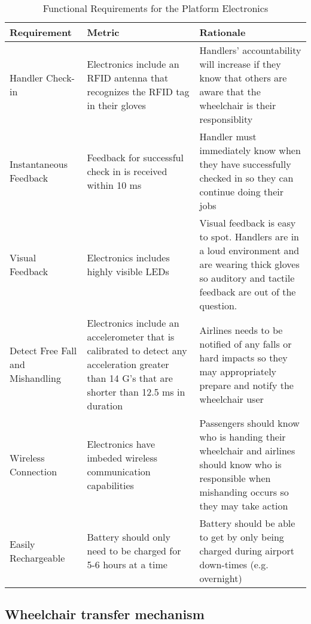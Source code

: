 \begin{table}
\begin{tabular} {| p{4cm} | p{5cm} | p{5cm} |}
\hline
\textbf{Requirement} & \textbf{Metric} & \textbf{Rationale} \\ \hline
Handler Check-in & Electronics include an RFID antenna that recognizes the RFID tag in their gloves & Handlers' accountability will increase if they know that others are aware that the wheelchair is their responsiblity \\ \hline
Instantaneous Feedback & 	Feedback for successful check in is received within 10 ms & Handler must immediately know when they have successfully checked in so they can continue doing their jobs\\ \hline
Visual Feedback & Electronics includes highly visible LEDs & Visual feedback is easy to spot. Handlers are in a loud environment and are wearing thick gloves so auditory and tactile feedback are out of the question.\  \\ \hline
Detect Free Fall and Mishandling & Electronics include an accelerometer that is calibrated to detect any acceleration greater than 14 G’s that are shorter than 12.5 ms in duration & Airlines needs to be notified of any falls or hard impacts so they may appropriately prepare and notify the wheelchair user \\ \hline
Wireless Connection & Electronics have imbeded wireless communication capabilities & Passengers should know who is handing their wheelchair and airlines should know who is responsible when mishanding occurs so they may take action \\ \hline
Easily Rechargeable & Battery should only need to be charged for 5-6 hours at a time & Battery should be able to get by only being charged during airport down-times (e.g. overnight) \\ \hline

\end{tabular} 
\caption{Functional Requirements for the Platform Electronics}
\label{tab:functional_requirements_electronics}
\end{table}

\clearpage
\newpage











\subsection*{Wheelchair transfer mechanism}

